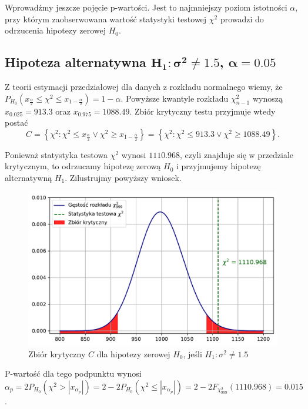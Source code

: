 \documentclass[12pt]{mwart}
\begin{document}
	
	\noindent Wprowadźmy jeszcze pojęcie p-wartości. Jest to najmniejszy poziom istotności $\alpha$, przy którym zaobserwowana wartość statystyki testowej $\chi^2$ prowadzi do odrzucenia hipotezy zerowej $H_0$.



	\subsection{Hipoteza alternatywna $\bm{H_1 \colon \sigma^2 \neq 1.5}$, $\bm{\alpha=0.05}$}
	\noindent Z teorii estymacji przedziałowej dla danych z rozkładu normalnego wiemy, że $P_{H_0}(x_{\frac{\alpha}{2}} \leq \chi^2 \leq x_{1-\frac{\alpha}{2}})=1 - \alpha$. Powyższe kwantyle rozkładu $\chi^2_{n-1}$ wynoszą $x_{0.025}=913.3$ oraz $x_{0.975}=1088.49$. Zbiór krytyczny testu przyjmuje wtedy postać
$$C = \left\lbrace \chi^2: \chi^2\leq x_{\frac{\alpha}{2}} \vee \chi^2\geq x_{1-\frac{\alpha}{2}} \right\rbrace = \left\lbrace \chi^2: \chi^2\leq 913.3 \vee \chi^2\geq 1088.49 \right\rbrace.$$ 

\noindent Ponieważ statystyka testowa $\chi^2$ wynosi $1110.968$, czyli znajduje się w przedziale krytycznym, to odrzucamy hipotezę zerową $H_0$ i przyjmujemy hipotezę alternatywną $H_1$. Zilustrujmy powyższy wniosek.

	\begin{figure}[H]
	\begin{center}
		\includegraphics[scale=0.6]{krytyczny4.pdf}
		\caption{Zbiór krytyczny $C$ dla hipotezy zerowej $H_0$, jeśli $H_1 \colon \sigma^2 \neq 1.5$}
	\end{center}
	\end{figure}


\noindent P-wartość dla tego podpunktu wynosi $\alpha_p = 2P_{H_0}(\chi^2 > |x_{\alpha_p}|) = 2 - 2P_{H_0}(\chi^2 \leq |x_{\alpha_p}|) = 2- 2F_{\chi^2_{999}}(1110.968) = 0.015$.
\end{document}
